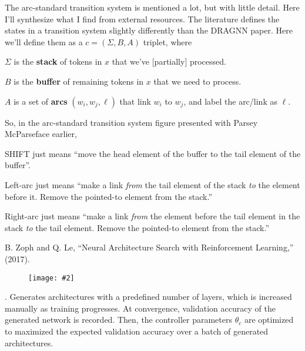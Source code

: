 \documentclass[11pt]{article}
\newcommand\myfig[2][0.3\textwidth]{\begin{figure}[h!]\centering\texttt{[image: \#2]}\end{figure}}
\newcommand\p{\Needspace{10\baselineskip} \noindent}
\begin{document}
The arc-standard transition system is mentioned a lot, but with little detail. Here I'll synthesize what I find from external resources. The literature defines the states in a transition system slightly differently than the DRAGNN paper. Here we'll define them as a  $c = (\Sigma, B, A)$ triplet, where
\begin{compactitem}
	\item $\Sigma$ is the \textbf{stack} of tokens in $x$ that we've [partially] processed.
	\item $B$ is the \textbf{buffer} of remaining tokens in $x$ that we need to process. 
	\item $A$ is a set of \textbf{arcs} $(w_i, w_j, \ell)$ that link $w_i$ to $w_j$, and label the arc/link as $\ell$. 
\end{compactitem}
So, in the arc-standard transition system figure presented with Parsey McParseface earlier, 
\begin{compactitem}
	\item SHIFT just means ``move the head element of the buffer to the tail element of the buffer''. 
	
	\item Left-arc just means ``make a link \textit{from} the tail element of the stack \textit{to} the element before it. Remove the pointed-to element from the stack.''
	
	\item Right-arc just means ``make a link \textit{from} the element before the tail element in the stack \textit{to} the tail element. Remove the pointed-to element from the stack.''
\end{compactitem}


\vspace{-1em}
{\footnotesize B. Zoph and Q. Le, ``Neural Architecture Search with Reinforcement Learning,'' (2017).}

\myfig[0.4\textwidth]{figs/nas.png}

\p {}. Generates architectures with a predefined number of layers, which is increased manually as training progresses. At convergence, validation accuracy of the generated network is recorded. Then, the controller parameters $\theta_c$ are optimized to maximized the expected validation accuracy over a batch of generated architectures. 
\end{document}
